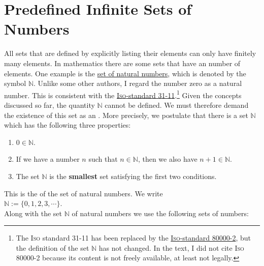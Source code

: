 \section{Predefined Infinite Sets of Numbers}
All sets that are defined by explicitly listing their elements can only have finitely many elements.  
In mathematics there are some sets that have an  number of
elements.  One example is the 
\href{http://en.wikipedia.org/wiki/Natural_number}{set of natural numbers},  
which is denoted by the symbol $\mathbb{N}$.
Unlike some other authors, I regard the number zero as a natural number.  This is consistent with the
\href{https://en.wikipedia.org/wiki/ISO_31-11}{\textsc{Iso}-standard 31-11}.\footnote{
  The \textsc{Iso} standard 31-11 has been replaced by the
  \href{https://en.wikipedia.org/wiki/ISO_80000-2}{\textsc{Iso}-standard 80000-2},
  but the definition of the set $\mathbb{N}$ has not changed.  In the text, I did not cite \textsc{Iso} 80000-2 because 
  its content is not freely available, at least not legally.
}
Given the concepts discussed so far, the quantity $\mathbb{N}$ cannot be defined.
We must therefore demand the existence of this set as an .  More precisely, we postulate that there is a
set $\mathbb{N}$ which has the following three properties:
\begin{enumerate}
\item $0 \in \mathbb{N}$.
\item If we have a number $n$ such that $n \in \mathbb{N}$, then we also have $n+1 \in \mathbb{N}$.
\item The set $\mathbb{N}$ is the \textbf{smallest} set satisfying the first two conditions.
\end{enumerate}
This is the  of the set of natural numbers.
We write \\[0.2cm]
\hspace*{1.3cm} $\mathbb{N} := \{ 0, 1, 2, 3, \cdots \}$. \\[0.2cm]
Along with the set $\mathbb{N}$ of natural numbers we use the following sets of numbers: 
